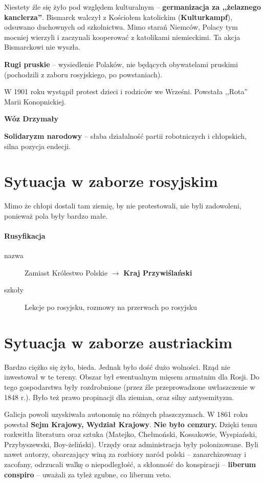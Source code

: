 \documentclass [a4paper, 11pt, oneside]{book}
\begin{document}
        Niestety źle się żyło pod względem kulturalnym -- \textbf{germanizacja za ,,żelaznego kanclerza''}. Bismarck walczył z Kościołem katolickim (\textbf{Kulturkampf}), odsuwano duchownych od szkolnictwa. Mimo starań Niemców, Polacy tym mocniej wierzyli i zaczynali kooperować z katolikami niemieckimi. Ta akcja Bismarckowi nie wyszła.

        \textbf{Rugi pruskie} -- wysiedlenie Polaków, nie będących obywatelami pruskimi (pochodzili z zaboru rosyjskiego, po powstaniach).

        W 1901 roku wystąpił protest dzieci i rodziców we Wrześni. Powstała ,,Rota'' Marii Konopnickiej.

        \textbf{Wóz Drzymały}

        \textbf{Solidaryzm narodowy} -- słaba działalność partii robotniczych i chłopskich, silna pozycja endecji.
    \section{Sytuacja w zaborze rosyjskim} %
    \label{sec:sytuacja_w_zaborze_rosyjskim}
        Mimo że chłopi dostali tam ziemię, by nie protestowali, nie byli zadowoleni, ponieważ pola były bardzo małe.

        \paragraph{Rusyfikacja}
        \begin{description}
            \item[nazwa] Zamiast Królestwo Polskie $\rightarrow$ \textbf{Kraj Przywiślański}
            \item[szkoły] Lekcje po rosyjsku, rozmowy na przerwach po rosyjsku
        \end{description}
    \section{Sytuacja w zaborze austriackim} %
    \label{sec:sytuacja_w_zaborze_austriackim}
        Bardzo ciężko się żyło, bieda. Jednak było dość dużo wolności. Rząd nie inwestował w te tereny. Obszar był ewentualnym mięsem armatnim dla Rosji. Do tego gospodarstwa były rozdrobnione (przez źle przeprowadzone uwłaszczenie w 1848 r.). Było też prawo propinacji dla ziemian, oraz silny antysemityzm.

        Galicja powoli uzyskiwała autonomię na różnych płaszczyznach. W 1861 roku powstał \textbf{Sejm Krajowy, Wydział Krajowy}. \textbf{Nie było cenzury.} Dzięki temu rozkwitła literatura oraz sztuka (Matejko, Chełmoński, Kossakowie, Wyspiański, Przybyszewski, Boy-żeliński). Urzędy oraz administracja były polonizowane. Byli nawet autorzy, obarczający winą za rozbiory naród polski -- zanarchizowany i zacofany, odrzucali walkę o niepodległość, a skłonność do konspiracji -- \textbf{liberum conspiro} -- uważali za tyleż zgubne, co liberum veto.
\end{document}
